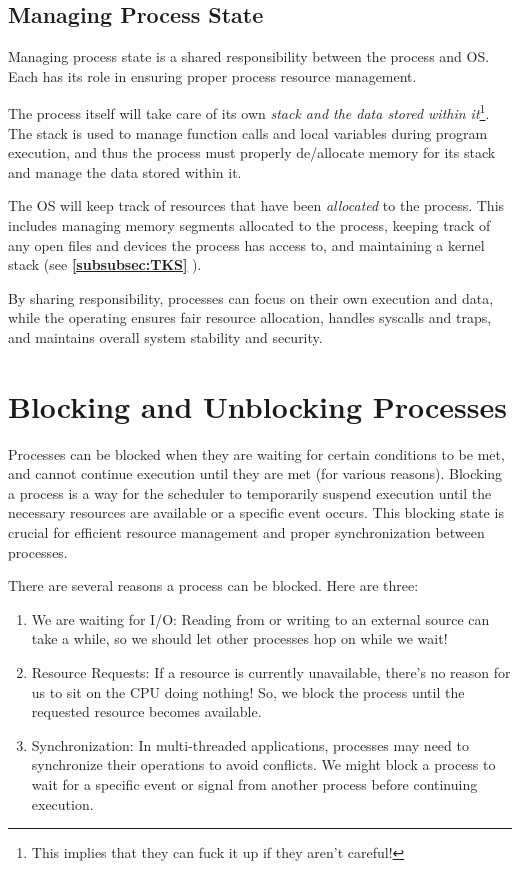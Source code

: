 \documentclass{report}
\newcommand{\exampleBegin}[1]{\begin{tcolorbox}[colback=blue!5!white,colframe=black!75!blue,title={Example:
      #1}]}
\newcommand{\exampleEnd}{\end{tcolorbox}}
\newcommand{\refto}[2]{\textbf{\ref{#1:#2} \nameref{#1:#2}}}
\begin{document}
\subsection{Managing Process State}
Managing process state is a shared responsibility between the process and OS. Each has its role in
ensuring proper process resource management.

The process itself will take care of its own \textit{stack and the data stored within
  it}\footnote{This implies that they can fuck it up if they aren't careful!}. The stack
is used to manage function calls and local variables during program execution, and thus the process
must properly de/allocate memory for its stack and manage the data stored within it.

The OS will keep track of resources that have been \textit{allocated} to the process. This includes
managing memory segments allocated to the process, keeping track of any open files and devices the
process has access to, and maintaining a kernel stack (see  \refto{subsubsec}{TKS}).

By sharing responsibility, processes can focus on their own execution and data, while the operating
ensures fair resource allocation, handles syscalls and traps, and maintains overall system stability
and security.


\section{Blocking and Unblocking Processes}
Processes can be blocked when they are waiting for certain conditions to be met, and cannot continue
execution until they are met (for various reasons). Blocking a process is a way for the scheduler to
temporarily suspend execution until the necessary resources are available or a specific event
occurs. This blocking state is crucial for efficient resource management and proper synchronization
between processes.

\exampleBegin{Unblock Me!}
There are several reasons a process can be blocked. Here are three:
\begin{enumerate}[label=\textit{(\roman*)}]
\item We are waiting for I/O: Reading from or writing to an external source can take a while, so we
  should let other processes hop on while we wait!
\item Resource Requests: If a resource is currently unavailable, there's no reason for us to sit on
  the CPU doing nothing! So, we block the process until the requested resource becomes available.
\item Synchronization: In multi-threaded applications, processes may need to synchronize their
  operations to avoid conflicts. We might block a process to wait for a specific event or signal
  from another process before continuing execution.
\end{enumerate}
\exampleEnd
\end{document}
